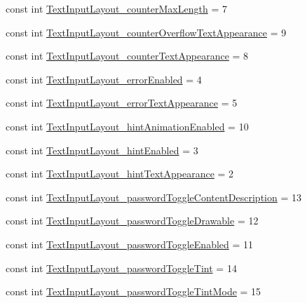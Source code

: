 \begin{CompactItemize}
\item 
const int \hyperlink{class__2doo_1_1_droid_1_1_resource_1_1_styleable_632a0a560a80966c6317a63eac2e974a}{TextInputLayout\_\-counterMaxLength} = 7
\item 
const int \hyperlink{class__2doo_1_1_droid_1_1_resource_1_1_styleable_cd4489d8fe51feb9a76040d5290ce019}{TextInputLayout\_\-counterOverflowTextAppearance} = 9
\item 
const int \hyperlink{class__2doo_1_1_droid_1_1_resource_1_1_styleable_fee878239cb4eccb8b52ede3bf5cffa7}{TextInputLayout\_\-counterTextAppearance} = 8
\item 
const int \hyperlink{class__2doo_1_1_droid_1_1_resource_1_1_styleable_7730096ecc4f51f778e14370e07de73b}{TextInputLayout\_\-errorEnabled} = 4
\item 
const int \hyperlink{class__2doo_1_1_droid_1_1_resource_1_1_styleable_811cfa7f75b33944dbae67291a3b26a0}{TextInputLayout\_\-errorTextAppearance} = 5
\item 
const int \hyperlink{class__2doo_1_1_droid_1_1_resource_1_1_styleable_649890687e272a29b0e2b36c226b8565}{TextInputLayout\_\-hintAnimationEnabled} = 10
\item 
const int \hyperlink{class__2doo_1_1_droid_1_1_resource_1_1_styleable_2014ed1c8fad7e9a81d33c4717b9fe53}{TextInputLayout\_\-hintEnabled} = 3
\item 
const int \hyperlink{class__2doo_1_1_droid_1_1_resource_1_1_styleable_9092b4d7a95a9c9617134950a51e0df6}{TextInputLayout\_\-hintTextAppearance} = 2
\item 
const int \hyperlink{class__2doo_1_1_droid_1_1_resource_1_1_styleable_5cbf96d1c311d3b42833d2297dfa2012}{TextInputLayout\_\-passwordToggleContentDescription} = 13
\item 
const int \hyperlink{class__2doo_1_1_droid_1_1_resource_1_1_styleable_5f7fea6e6546e578c4e043bf6bceeed8}{TextInputLayout\_\-passwordToggleDrawable} = 12
\item 
const int \hyperlink{class__2doo_1_1_droid_1_1_resource_1_1_styleable_893b79e24a88e74c186108c04d02dc32}{TextInputLayout\_\-passwordToggleEnabled} = 11
\item 
const int \hyperlink{class__2doo_1_1_droid_1_1_resource_1_1_styleable_6af8cd231e7bc0c9e129d46cb617a567}{TextInputLayout\_\-passwordToggleTint} = 14
\item 
const int \hyperlink{class__2doo_1_1_droid_1_1_resource_1_1_styleable_fb484505cc12443c916e0129244e8af5}{TextInputLayout\_\-passwordToggleTintMode} = 15
\item 

\end{CompactItemize}
